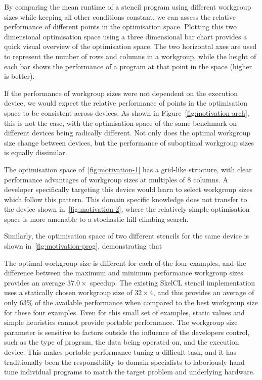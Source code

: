 By comparing the mean runtime of a stencil program using different
workgroup sizes while keeping all other conditions constant, we can
assess the relative performance of different points in the
optimisation space. Plotting this two dimensional optimisation space
using a three dimensional bar chart provides a quick visual overview
of the optimisation space. The two horizontal axes are used to
represent the number of rows and columns in a workgroup, while the
height of each bar shows the performance of a program at that point in
the space (higher is better).

If the performance of workgroup sizes were not dependent on the
execution device, we would expect the relative performance of points
in the optimisation space to be consistent across devices. As shown in
Figure~\ref{fig:motivation-arch}, this is not the case, with the
optimisation space of the same benchmark on different devices being
radically different. Not only does the optimal workgroup size change
between devices, but the performance of suboptimal workgroup sizes is
equally dissimilar.

The optimisation space of~\ref{fig:motivation-1} has a grid-like
structure, with clear performance advantages of workgroup sizes at
multiples of 8 columns. A developer specifically targeting this device
would learn to select workgroup sizes which follow this pattern. This
domain specific knowledge does not transfer to the device shown
in~\ref{fig:motivation-2}, where the relatively simple optimisation
space is more amenable to a stochastic hill climbing search.

Similarly, the optimisation space of two different stencils for the
same device is shown in~\ref{fig:motivation-prog}, demonstrating that


The optimal workgroup size is different for each of the four examples,
and the difference between the maximum and minimum performance
workgroup sizes provides an average $37.0\times$ speedup. The existing
SkelCL stencil implementation uses a statically chosen workgroup size
of $32\times4$, and this provides an average of only 63\% of the
available performance when compared to the best workgroup size for
these four examples. Even for this small set of examples, static
values and simple heuristics cannot provide portable performance. The
workgroup size parameter is sensitive to factors outside the influence
of the developers control, such as the type of program, the data being
operated on, and the execution device. This makes portable performance
tuning a difficult task, and it has traditionally been the
responsibility to domain specialists to laboriously hand tune
individual programs to match the target problem and underlying
hardware.

